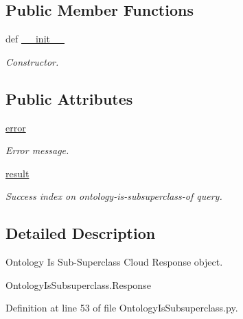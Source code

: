 \subsection*{Public Member Functions}
\begin{DoxyCompactItemize}
\item 
def \hyperlink{classRappCloud_1_1CloudMsgs_1_1OntologyIsSubsuperclass_1_1OntologyIsSubsuperclass_1_1Response_a6499ba9eccfe66cd038755aaa8cabcfd}{\-\_\-\-\_\-init\-\_\-\-\_\-}
\begin{DoxyCompactList}\small\item\em Constructor. \end{DoxyCompactList}\end{DoxyCompactItemize}
\subsection*{Public Attributes}
\begin{DoxyCompactItemize}
\item 
\hyperlink{classRappCloud_1_1CloudMsgs_1_1OntologyIsSubsuperclass_1_1OntologyIsSubsuperclass_1_1Response_a8e8e0b4bdc4b8d7af99bb4b393e71ac4}{error}
\begin{DoxyCompactList}\small\item\em Error message. \end{DoxyCompactList}\item 
\hyperlink{classRappCloud_1_1CloudMsgs_1_1OntologyIsSubsuperclass_1_1OntologyIsSubsuperclass_1_1Response_a7edb2bb06aa0ffe0bd11cd2e0050c844}{result}
\begin{DoxyCompactList}\small\item\em Success index on ontology-\/is-\/subsuperclass-\/of query. \end{DoxyCompactList}\end{DoxyCompactItemize}


\subsection{Detailed Description}
\begin{DoxyVerb}Ontology Is Sub-Superclass Cloud Response object.

OntologyIsSubsuperclass.Response
\end{DoxyVerb}
 

Definition at line 53 of file Ontology\-Is\-Subsuperclass.\-py.



